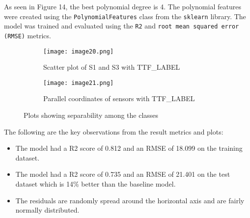 \documentclass{article}
\begin{document}
As seen in Figure 14, the best polynomial degree is 4. The polynomial features were created using the \texttt{PolynomialFeatures} class from the \texttt{sklearn} library.
The model was trained and evaluated using the \texttt{R2} and \texttt{root mean squared error (RMSE)} metrics.
\begin{figure}[h]
	\begin{subfigure}{.5\textwidth}
		\centering
		\texttt{[image: image20.png]}
		\caption{Scatter plot of S1 and S3 with TTF\_LABEL}
		\label{fig:sfig1}
	\end{subfigure}%
	\begin{subfigure}{.5\textwidth}
		\centering
		\texttt{[image: image21.png]}
		\caption{Parallel coordinates of sensors with TTF\_LABEL}
		\label{fig:sfig2}
	\end{subfigure}
	\caption{Plots showing separability among the classes}
	\label{fig:fig}
\end{figure}

The following are the key observations from the result metrics and plots:
\begin{itemize}[topsep=0pt]
	\item The model had a R2 score of 0.812 and an RMSE of 18.099 on the training dataset.
	\item The model had a R2 score of 0.735 and an RMSE of 21.401 on the test dataset which is 14\% better than the baseline model.
	\item The residuals are randomly spread around the horizontal axis and are fairly normally distributed.
\end{itemize}
\end{document}
